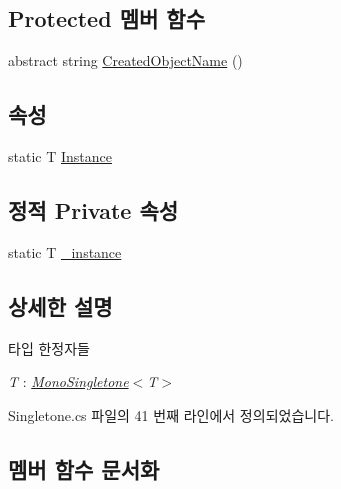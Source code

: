 \subsection*{Protected 멤버 함수}
\begin{DoxyCompactItemize}
\item 
abstract string \hyperlink{class_m_c_n_1_1_mono_singletone_a3dde6c2c7e6a3723102f059a043aed22}{Created\+Object\+Name} ()
\end{DoxyCompactItemize}
\subsection*{속성}
\begin{DoxyCompactItemize}
\item 
static T \hyperlink{class_m_c_n_1_1_mono_singletone_aa50c027cca64cf4ad30c1ee5c83e0b78}{Instance}
\end{DoxyCompactItemize}
\subsection*{정적 Private 속성}
\begin{DoxyCompactItemize}
\item 
static T \hyperlink{class_m_c_n_1_1_mono_singletone_a790a4dfd828c6e4f008ad64d33d61ac0}{\+\_\+instance}
\end{DoxyCompactItemize}


\subsection{상세한 설명}
\begin{Desc}
\item[타입 한정자들]\begin{description}
\item[{\em T} : {\em \hyperlink{class_m_c_n_1_1_mono_singletone}{Mono\+Singletone}$<$T$>$}]\end{description}
\end{Desc}


Singletone.\+cs 파일의 41 번째 라인에서 정의되었습니다.



\subsection{멤버 함수 문서화}
